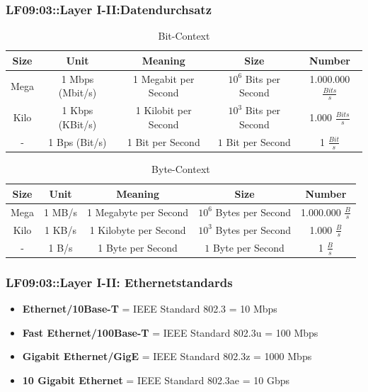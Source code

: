 \begin{frame}  
  \frametitle{LF09:03::Layer I-II:Datendurchsatz }

  \begin{tiny}
  \begin{center}
  \begin{table}
  \caption{Bit-Context}
  \renewcommand{\arraystretch}{1.5}
  \begin{tabular}{|c||c|c|c|c|}
    \hline
    Size & Unit & Meaning & Size & Number \\
    \hline
    \hline
    Mega & 1 Mbps (Mbit/s) & 1 Megabit per Second &  $10^6$ Bits per Second & 1.000.000 $\frac{Bits}{s}$\\
    \hline
    Kilo & 1 Kbps (KBit/s) & 1 Kilobit per Second &  $10^3$ Bits per Second & 1.000 $\frac{Bits}{s}$ \\
    \hline
     - & 1 Bps (Bit/s) & 1 Bit per Second &  $1$ Bit per Second & 1 $\frac{Bit}{s}$ \\
    \hline
  \end{tabular}
  \end{table}

  \vspace{0.4cm}
  \begin{table}
  \caption{Byte-Context}
  \renewcommand{\arraystretch}{1.5}
  \begin{tabular}{|c||c|c|c|c|}
    \hline
    Size & Unit & Meaning & Size & Number\\
    \hline
    \hline
    Mega & 1 MB/s & 1 Megabyte per Second & $10^6$ Bytes per Second & 1.000.000 $\frac{B}{s}$ \\
    \hline
    Kilo & 1 KB/s & 1 Kilobyte per Second & $10^3$ Bytes per Second & 1.000 $\frac{B}{s}$\\
    \hline
     - & 1 B/s & 1 Byte per Second &  $1$ Byte per Second & 1 $\frac{B}{s}$ \\
    \hline
  \end{tabular}  
\end{table}
  \end{center}
  \end{tiny}

\end{frame}


\begin{frame}  
  \frametitle{LF09:03::Layer I-II: Ethernetstandards }

  \begin{itemize}
    \item \textbf{Ethernet/10Base-T} = IEEE Standard 802.3 = 10 Mbps
    \item \textbf{Fast Ethernet/100Base-T} = IEEE Standard 802.3u = 100 Mbps
    \item \textbf{Gigabit Ethernet/GigE} = IEEE Standard 802.3z = 1000 Mbps
    \item \textbf{10 Gigabit Ethernet} = IEEE Standard 802.3ae = 10 Gbps
  \end{itemize}

\end{frame}

